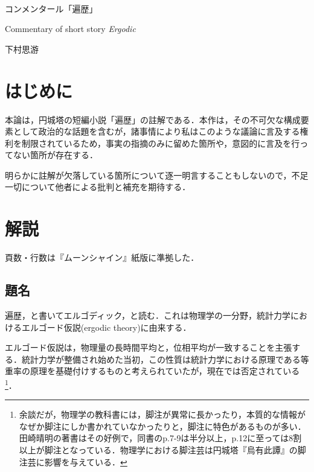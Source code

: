 \documentclass[10pt, a5paper, twoside]{jsarticle}
\theoremstyle{definition}
\begin{document}
	~ %

	\begin{center}

		\Large{コンメンタール「遍歴」}

		\vspace{3mm}

		\large{Commentary of short story \textit{Ergodic}}

		\vspace{3mm}
		
		\large{下村思游}

	\end{center}

	\vspace{3mm}

	\section{はじめに}

		本論は，円城塔の短編小説「遍歴」の註解である．本作は，その不可欠な構成要素として政治的な話題を含むが，諸事情により私はこのような議論に言及する権利を制限されているため，事実の指摘のみに留めた箇所や，意図的に言及を行ってない箇所が存在する．

		明らかに註解が欠落している箇所について逐一明言することもしないので，不足一切について他者による批判と補充を期待する．

	\section{解説}

		頁数・行数は『ムーンシャイン』紙版\cite{moonshine}に準拠した．

		\subsection{題名}

		遍歴，と書いてエルゴディック，と読む．これは物理学の一分野，統計力学におけるエルゴード仮説(ergodic theory)に由来する．

		エルゴード仮説は，物理量の長時間平均と，位相平均が一致することを主張する．統計力学が整備され始めた当初，この性質は統計力学における原理である等重率の原理を基礎付けするものと考えられていたが，現在では否定されている\cite{tsk}\footnote{余談だが，物理学の教科書には，脚注が異常に長かったり，本質的な情報がなぜか脚注にしか書かれていなかったりと，脚注に特色があるものが多い．田崎晴明の著書はその好例で，同書のp.7-9は半分以上，p.12に至っては8割以上が脚注となっている．物理学における脚注芸は円城塔『烏有此譚』の脚注芸に影響を与えている．}．
\end{document}
